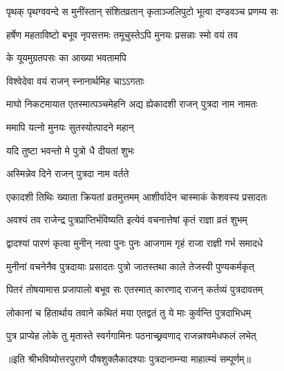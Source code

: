 \twolineshloka
{पृथक् पृथग्ववन्दे स मुनींस्तान् संशितव्रतान्}
{कृताञ्जलिपुटो भूत्वा दण्डवञ्च प्रणम्य सः} %

\twolineshloka
{हर्षेण महताविष्टो बभूव नृपसत्तमः}
{तमूचुस्तेऽपि मुनयः प्रसन्नाः स्मो वयं तव} %



\onelineshloka
{के यूयमुग्रतपसः का आख्या भवतामपि} %



\onelineshloka
{विश्वेदेवा वयं राजन् स्नानार्थमिह चाऽऽगताः} %

\twolineshloka
{माघो निकटमायात एतस्मात्पञ्चमेहनि}
{अद्य ह्येकादशी राजन् पुत्रदा नाम नामतः} %



\onelineshloka
{ममापि यत्नो मुनयः सुतस्योत्पादने महान्} %

\onelineshloka
{यदि तुष्टा भवन्तो मे पुत्रो धै दीयतां शुभः}


\onelineshloka
{अस्मिन्नेव दिने राजन् पुत्रदा नाम वर्तते} %

\twolineshloka
{एकादशी तिथिः ख्याता क्रियतां व्रतमुत्तमम्}
{आशीर्वादेन चास्माकं केशवस्य प्रसादतः} %

\twolineshloka
{अवश्यं तव राजेन्द्र पुत्रप्राप्तिर्भविष्यति}
{इत्येवं वचनात्तेषां कृतं राज्ञा व्रतं शुभम्} %


\twolineshloka
{द्वादश्यां पारणं कृत्वा मुनीन् नत्वा पुनः पुनः}
{आजगाम गृहं राजा राज्ञी गर्भ समादधे} %

\twolineshloka
{मुनीनां वचनेनैव पुत्रदायाः प्रसादतः}
{पुत्रो जातस्तथा काले तेजस्वी पुण्यकर्मकृत्} %

\twolineshloka
{पितरं तोषयामास प्रजापालो बभूव सः}
{एतस्मात् कारणाद् राजन् कर्तव्यं पुत्रदावतम्} %

\twolineshloka
{लोकानां च हितार्थाय तवाने कथितं मया}
{एतद्वतं तु ये माः कुर्वन्ति पुत्रदाभिधम्} %

\twolineshloka
{पुत्र प्राप्येह लोके तु मृतास्ते स्वर्गगामिनः}
{पठनाच्छ्रवणाद् राजन्नश्वमेधफलं लभेत्} %

॥इति श्रीभविष्योत्तरपुराणे पौषशुक्लैकादश्याः पुत्रदानाम्न्या माहात्म्यं सम्पूर्णम्॥


